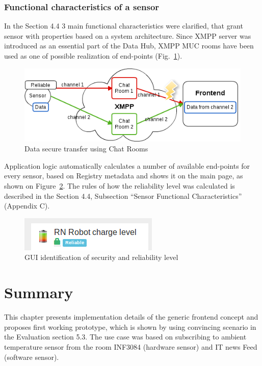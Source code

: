 \subsubsection{Functional characteristics of a sensor}
In the Section 4.4 3 main functional characteristics were clarified, that grant sensor with properties based on a system architecture.
Since XMPP server was introduced as an essential part of the Data Hub, XMPP MUC rooms have been used as one of possible realization of end-points (Fig.~\ref{img:reliability}). 
\begin{figure}[!ht]
\centering
\includegraphics[scale=0.6]{images/security.png}   
\caption[Security]{Data secure transfer using Chat Rooms} 
\label{img:reliability}                        
\end{figure}
Application logic automatically calculates a number of available end-points for every sensor, based on Registry metadata and shows it on the main page, as shown on Figure~\ref{img:icons}. The rules of how the reliability level was calculated is described in the Section 4.4, Subsection ``Sensor Functional Characteristics'' (Appendix C).
\newline
\begin{figure}[!ht]
\centering
\includegraphics[scale=1.0]{Screenshots/Icons.png}   
\caption[GUI identification of security and reliability level]{GUI identification of security and reliability level}
\label{img:icons}    
\end{figure}


\section{Summary}
This chapter presents implementation details of the generic frontend concept and proposes first working prototype, which is shown by using convincing scenario in the Evaluation section 5.3. The use case was based on subscribing to ambient temperature sensor from the room INF3084 (hardware sensor) and IT news Feed (software sensor).

